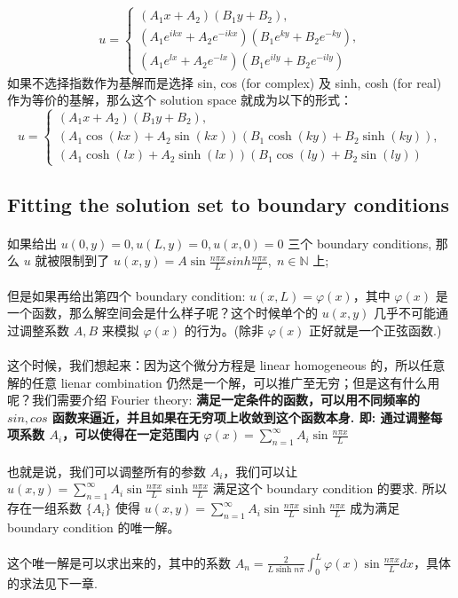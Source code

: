 \[
u = 
\begin{cases} 
(A_1 x + A_2)(B_1 y + B_2), \\ 
(A_1 e^{ikx} + A_2 e^{-ikx})(B_1 e^{ky} + B_2 e^{-ky}), \\
(A_1 e^{lx} + A_2 e^{-lx})(B_1 e^{ily} + B_2 e^{-ily})
\end{cases}
\]
如果不选择指数作为基解而是选择 sin, cos (for complex) 及 sinh, cosh (for real) 作为等价的基解，那么这个 solution space 就成为以下的形式：
\[
u = 
\begin{cases} 
(A_1 x + A_2)(B_1 y + B_2), \\
(A_1 \cos(kx) + A_2 \sin(kx))(B_1 \cosh(ky) + B_2 \sinh(ky)), \\
(A_1 \cosh(lx) + A_2 \sinh(lx))(B_1 \cos(ly) + B_2 \sin(ly))
\end{cases}
\]


\subsection{Fitting the solution set to boundary conditions}
\paragraph{} 如果给出 $u(0,y) = 0, u(L,y) = 0, u(x,0) = 0$ 三个 boundary conditions, 那么 $u$ 就被限制到了 $u(x,y) = A \sin{\frac{n \pi x}{L}} sinh{\frac{n \pi x}{L}}, \; n\in \mathbb{N}$ 上;
\\\\但是如果再给出第四个 boundary condition: $u(x, L) = \varphi(x)$，其中 $\varphi(x)$ 是一个函数，那么解空间会是什么样子呢？这个时候单个的 $u(x,y)$ 几乎不可能通过调整系数 $A, B$ 来模拟 $\varphi(x)$ 的行为。(除非 $\varphi(x)$ 正好就是一个正弦函数.)
\\\\这个时候，我们想起来：因为这个微分方程是 linear homogeneous 的，所以任意解的任意 lienar combination 仍然是一个解，可以推广至无穷；但是这有什么用呢？我们需要介绍 Fourier theory: \textbf{满足一定条件的函数，可以用不同频率的 $sin, cos$ 函数来逼近，并且如果在无穷项上收敛到这个函数本身. 即: 通过调整每项系数 $A_i$，可以使得在一定范围内 $\varphi(x) = \sum_{n=1}^{\infty} A_i \sin{\frac{n \pi x}{L}}$}
\\\\也就是说，我们可以调整所有的参数 $A_i$，我们可以让 $u(x,y) = \sum_{n=1}^{\infty} A_i \sin \frac{n \pi x}{L} \sinh \frac{n \pi x}{L}$ 满足这个 boundary condition 的要求. 所以存在一组系数 $\{A_i\}$ 使得 $u(x,y) = \sum_{n=1}^{\infty} A_i \sin \frac{n \pi x}{L} \sinh \frac{n \pi x}{L}$  成为满足 boundary condition 的唯一解。
\\\\这个唯一解是可以求出来的，其中的系数 $A_n = \frac{2}{L \sinh{n \pi }} \int_0^L \varphi(x) \sin \frac{n \pi x}{L}dx$，具体的求法见下一章.


